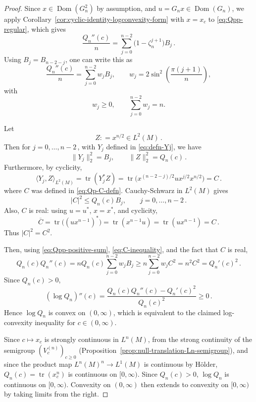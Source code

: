\documentclass[11pt,a4paper]{article}
\theoremstyle{plain}
\numberwithin{theorem}{section}
\theoremstyle{definition}
\newcommand{\?}{\overset{?}{=}}
\newcommand{\defeq}{\mathrel{\mathop:}=}
\DeclareMathOperator{\tr}{tr}
\newcommand{\lb}{\left (}
\newcommand{\rb}{\right )}
\newcommand{\bfrac}[2]{\lb\frac{#1}{#2}\rb}  	%
\newcommand{\I}{\infty}
\DeclareMathOperator{\Dom}{Dom}
\begin{document}
\begin{proof}
Since $x\in\Dom(G_n^2)$ by assumption, and $u=G_nx\in\Dom(G_n)$, we apply Corollary~\ref{cor:cyclic-identity-logconvexity-form} with $x=x_c$ to \eqref{eq:Qpp-regular}, which gives
\begin{equation}\label{eq:Qypp}
  \frac{Q_n''(c)}{n}
  =\sum_{j=0}^{n-2}\bigl(1-\zeta_n^{j+1}\bigr)B_j\,.
\end{equation}
Using $B_j=B_{n-2-j}$, one can write this as 
\begin{equation}\label{eq:Qpp-positive-sum}
    \frac{Q_n''(c)}{n} = \sum_{j=0}^{n-2}w_jB_j, \qquad w_j=2\sin^2\bfrac{\pi(j+1)}{n},
\end{equation}
with
\begin{equation*}
    w_j\geq0,\qquad \sum_{j=0}^{n-2}w_j=n.
\end{equation*}

Let
\begin{equation*}
  Z \defeq x^{n/2}\in L^2(M)\,.
\end{equation*}
Then for $j=0,\ldots,n-2$\,, with $Y_j$ defined in \eqref{eq:defn-Yj}, we have
\begin{equation*}
  \|Y_j\|_2^2=B_j,
  \qquad
  \|Z\|_2^2=Q_n(c)\,.
\end{equation*}
Furthermore, by cyclicity,
\begin{equation*}
  \langle Y_j,Z\rangle_{L^2(M)}=\tr(Y_j^*Z) =\tr\bigl(x^{(n-2-j)/2}ux^{j/2}x^{n/2}\bigr)=C\,.
\end{equation*}
where $C$ was defined in \eqref{eq:Qp-C-defn}. 
Cauchy-Schwarz in $L^2(M)$ gives
\begin{equation}\label{eq:C-inequality}
  |C|^2\leq Q_n(c)B_j,
  \qquad j=0,\ldots,n-2\,.
\end{equation}
Also, $C$ is real: using $u=u^*$, $x=x^*$, and cyclicity,
\begin{equation*}
  \overline C
  =\tr\bigl((ux^{n-1})^*\bigr)
  =\tr(x^{n-1}u)
  =\tr(ux^{n-1})
  =C\,.
\end{equation*}
Thus $|C|^2=C^2$.

Then, using \eqref{eq:Qpp-positive-sum}, \eqref{eq:C-inequality}, and the fact that $C$ is real,
\begin{equation*}
  Q_n(c)Q_n''(c)=nQ_n(c)\sum_{j=0}^{n-2} w_j B_j \geq n\sum_{j=0}^{n-2} w_j C^2 =n^2C^2 = Q_n'(c)^2\,.
\end{equation*}
Since $Q_n(c)>0$,
\begin{equation}
  (\log Q_n)''(c)
  =\frac{Q_n(c)Q_n''(c)-Q_n'(c)^2}{Q_n(c)^2}
  \geq 0\,.
\end{equation}
Hence $\log Q_n$ is convex on $(0,\infty)$, which is equivalent to the claimed log-convexity inequality for $c\in(0,\infty)$.

Since $c\mapsto x_c$ is strongly continuous in $L^n(M)$, from the strong continuity of the semigroup $(V_c^{(n)})_{c\geq0}$ (Proposition~\ref{prop:null-translation-Ln-semigroup}), and since the product map $L^n(M)^n\to L^1(M)$ is continuous by H\"{o}lder, $Q_n(c)=\tr(x_c^n)$ is continuous on $[0,\I)$. Since $Q_n(c)>0$, $\log Q_n$ is continuous on $[0,\I)$. Convexity on $(0,\I)$ then extends to convexity on $[0,\I)$ by taking limits from the right.
\end{proof}
\end{document}
